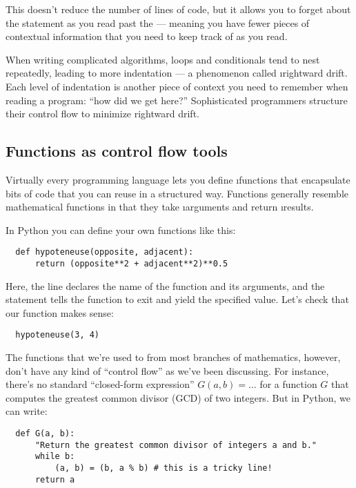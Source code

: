 \documentclass[letterpaper, 12pt, titlepage, twoside]{article}
\begin{document}
This doesn't reduce the number of lines of code, but it allows you to forget
about the  statement as you read past the  --- meaning you
have fewer pieces of contextual information that you need to keep track of as
you read.

When writing complicated algorithms, loops and conditionals tend to nest
repeatedly, leading to more indentation --- a phenomenon called \i{rightward
  drift}. Each level of indentation is another piece of context you need to
remember when reading a program: ``how did we get here?'' Sophisticated
programmers structure their control flow to minimize rightward drift.

\subsection*{Functions as control flow tools}

Virtually every programming language lets you define \i{functions} that
encapsulate bits of code that you can reuse in a structured way. Functions
generally resemble mathematical functions in that they take \i{arguments} and
return \i{results}.

In Python you can define your own functions like this:

\begin{lstlisting}
  def hypoteneuse(opposite, adjacent):
      return (opposite**2 + adjacent**2)**0.5
\end{lstlisting}

Here, the  line declares the name of the function and its arguments,
and the  statement tells the function to exit and yield the
specified value. Let's check that our function makes sense:

\begin{lstlisting}
  hypoteneuse(3, 4)
\end{lstlisting}

The functions that we're used to from most branches of mathematics, however,
don't have any kind of ``control flow'' as we've been discussing. For
instance, there's no standard ``closed-form expression'' $G(a,b) = \ldots$ for
a function $G$ that computes the greatest common divisor (GCD) of two
integers. But in Python, we can write:

\begin{lstlisting}
  def G(a, b):
      "Return the greatest common divisor of integers a and b."
      while b:
          (a, b) = (b, a % b) # this is a tricky line!
      return a
\end{lstlisting}
\end{document}
